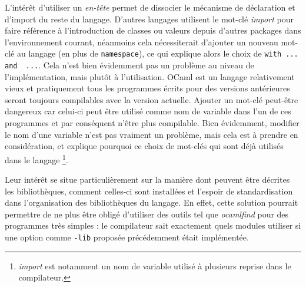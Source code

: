 \documentclass[11pt,a4paper]{report}
\begin{document}
L'intérêt d'utiliser un \emph{en-tête} permet de dissocier le mécanisme de
déclaration et d'import du reste du langage. D'autres langages utilisent le
mot-clé \emph{import} pour faire référence à l'introduction de classes ou
valeurs depuis d'autres packages dans l'environnement courant, néanmoins cela
nécessiterait d'ajouter un nouveau mot-clé au langage (en plus de
\texttt{namespace}), ce qui explique alors le choix de 
\lstinline{with ... and  ...}. 
Cela n'est bien évidemment pas un problème au niveau de
l'implémentation, mais plutôt à l'utilisation. OCaml est un langage relativement
vieux et pratiquement tous les programmes écrits pour des versions antérieures
seront toujours compilables avec la version actuelle. Ajouter un mot-clé
peut-être dangereux car celui-ci peut être utilisé comme nom de variable dans
l'un de ces programmes et par conséquent n'être plus compilable. Bien
évidemment, modifier le nom d'une variable n'est pas vraiment un problème, mais
cela est à prendre en considération, et explique pourquoi ce choix de mot-clés
qui sont déjà utilisés dans le langage \footnote{\emph{import} est notamment un
  nom de variable utilisé à plusieurs reprise dans le compilateur.}.

Leur intérêt se situe particulièrement sur la manière dont peuvent être décrites
les bibliothèques, comment celles-ci sont installées et l'espoir de
standardisation dans l'organisation des bibliothèques du langage. En effet,
cette solution pourrait permettre de ne plus être obligé d'utiliser des outils
tel que \emph{ocamlfind} pour des programmes très simples : le compilateur sait
exactement quels modules utiliser si une option comme \texttt{-lib} proposée
précédemment était implémentée. %
\end{document}
